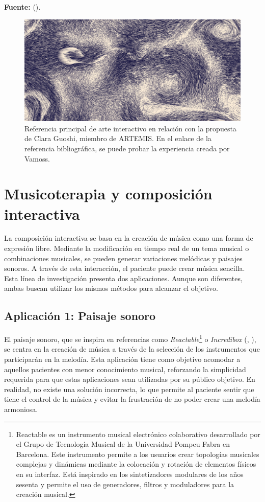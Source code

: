 \begin{center}
	\textbf{Fuente:} \citeauthor{VAMOSS:2023} (\citeyear{VAMOSS:2023}).
	\vspace{-18pt}
\end{center}

\begin{figure}[h!]
	\centering
	\includegraphics[width=0.4\linewidth]{Figuras/Desarrollo/MarParticulas.png}
	\caption[Referencia principal de arte interactivo Vamoss.]{Referencia principal de arte interactivo en relación con la propuesta de Clara Guoshi, miembro de ARTEMIS. En el enlace de la referencia bibliográfica, se puede probar la experiencia creada por Vamoss.}
	\label{fig:SeaParticles}
\end{figure}

\section{Musicoterapia y composición interactiva}

La composición interactiva se basa en la creación de música como una forma de expresión libre. Mediante la modificación en tiempo real de un tema musical o combinaciones musicales, se pueden generar variaciones melódicas y paisajes sonoros. A través de esta interacción, el paciente puede crear música sencilla. Esta línea de investigación presenta dos aplicaciones. Aunque son diferentes, ambas buscan utilizar los mismos métodos para alcanzar el objetivo.

\subsection{Aplicación 1: Paisaje sonoro}

El paisaje sonoro, que se inspira en referencias como \textit{Reactable}\footnote{Reactable es un instrumento musical electrónico colaborativo desarrollado por el Grupo de Tecnología Musical de la Universidad Pompeu Fabra en Barcelona. Este instrumento permite a los usuarios crear topologías musicales complejas y dinámicas mediante la colocación y rotación de elementos físicos en su interfaz. Está inspirado en los sintetizadores modulares de los años sesenta y permite el uso de generadores, filtros y moduladores para la creación musical.} o \textit{Incredibox} (\citeauthor{INCREDIBOX:2023}, \citeyear{INCREDIBOX:2023}), se centra en la creación de música a través de la selección de los instrumentos que participarán en la melodía. Esta aplicación tiene como objetivo acomodar a aquellos pacientes con menor conocimiento musical, reforzando la simplicidad requerida para que estas aplicaciones sean utilizadas por su público objetivo. En realidad, no existe una solución incorrecta, lo que permite al paciente sentir que tiene el control de la música y evitar la frustración de no poder crear una melodía armoniosa.

